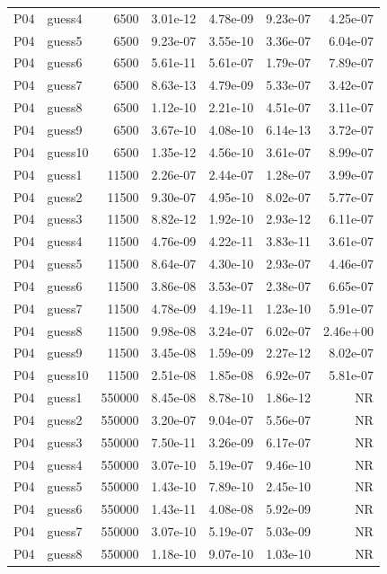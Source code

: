 {\begin{longtable}{llrrrrr}
P04 & guess4 & 6500 & 3.01e-12 & 4.78e-09 & 9.23e-07 & 4.25e-07 \\
P04 & guess5 & 6500 & 9.23e-07 & 3.55e-10 & 3.36e-07 & 6.04e-07 \\
P04 & guess6 & 6500 & 5.61e-11 & 5.61e-07 & 1.79e-07 & 7.89e-07 \\
P04 & guess7 & 6500 & 8.63e-13 & 4.79e-09 & 5.33e-07 & 3.42e-07 \\
P04 & guess8 & 6500 & 1.12e-10 & 2.21e-10 & 4.51e-07 & 3.11e-07 \\
P04 & guess9 & 6500 & 3.67e-10 & 4.08e-10 & 6.14e-13 & 3.72e-07 \\
P04 & guess10 & 6500 & 1.35e-12 & 4.56e-10 & 3.61e-07 & 8.99e-07 \\
P04 & guess1 & 11500 & 2.26e-07 & 2.44e-07 & 1.28e-07 & 3.99e-07 \\
P04 & guess2 & 11500 & 9.30e-07 & 4.95e-10 & 8.02e-07 & 5.77e-07 \\
P04 & guess3 & 11500 & 8.82e-12 & 1.92e-10 & 2.93e-12 & 6.11e-07 \\
P04 & guess4 & 11500 & 4.76e-09 & 4.22e-11 & 3.83e-11 & 3.61e-07 \\
P04 & guess5 & 11500 & 8.64e-07 & 4.30e-10 & 2.93e-07 & 4.46e-07 \\
P04 & guess6 & 11500 & 3.86e-08 & 3.53e-07 & 2.38e-07 & 6.65e-07 \\
P04 & guess7 & 11500 & 4.78e-09 & 4.19e-11 & 1.23e-10 & 5.91e-07 \\
P04 & guess8 & 11500 & 9.98e-08 & 3.24e-07 & 6.02e-07 & 2.46e+00 \\
P04 & guess9 & 11500 & 3.45e-08 & 1.59e-09 & 2.27e-12 & 8.02e-07 \\
P04 & guess10 & 11500 & 2.51e-08 & 1.85e-08 & 6.92e-07 & 5.81e-07 \\
P04 & guess1 & 550000 & 8.45e-08 & 8.78e-10 & 1.86e-12 & NR \\
P04 & guess2 & 550000 & 3.20e-07 & 9.04e-07 & 5.56e-07 & NR \\
P04 & guess3 & 550000 & 7.50e-11 & 3.26e-09 & 6.17e-07 & NR \\
P04 & guess4 & 550000 & 3.07e-10 & 5.19e-07 & 9.46e-10 & NR \\
P04 & guess5 & 550000 & 1.43e-10 & 7.89e-10 & 2.45e-10 & NR \\
P04 & guess6 & 550000 & 1.43e-11 & 4.08e-08 & 5.92e-09 & NR \\
P04 & guess7 & 550000 & 3.07e-10 & 5.19e-07 & 5.03e-09 & NR \\
P04 & guess8 & 550000 & 1.18e-10 & 9.07e-10 & 1.03e-10 & NR \\

\end{longtable}}
